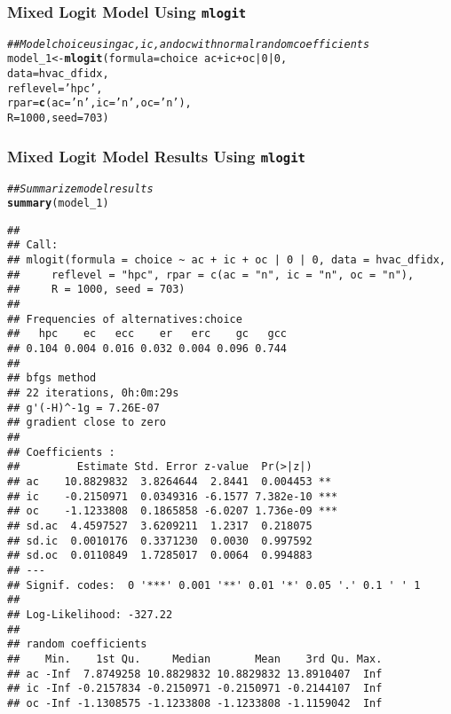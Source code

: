 \documentclass{beamer}\usepackage[]{graphicx}\usepackage[]{color}
\makeatletter
\newcommand{\hlnum}[1]{\textcolor[rgb]{0.686,0.059,0.569}{#1}}%
\newcommand{\hlstr}[1]{\textcolor[rgb]{0.192,0.494,0.8}{#1}}%
\newcommand{\hlcom}[1]{\textcolor[rgb]{0.678,0.584,0.686}{\textit{#1}}}%
\newcommand{\hlopt}[1]{\textcolor[rgb]{0,0,0}{#1}}%
\newcommand{\hlstd}[1]{\textcolor[rgb]{0.345,0.345,0.345}{#1}}%
\newcommand{\hlkwb}[1]{\textcolor[rgb]{0.69,0.353,0.396}{#1}}%
\newcommand{\hlkwc}[1]{\textcolor[rgb]{0.333,0.667,0.333}{#1}}%
\newcommand{\hlkwd}[1]{\textcolor[rgb]{0.737,0.353,0.396}{\textbf{#1}}}%
\newenvironment{kframe}{%
 \def\at@end@of@kframe{}%
 \ifinner\ifhmode%
  \def\at@end@of@kframe{\end{minipage}}%
  \begin{minipage}{\columnwidth}%
 \fi\fi%
 \def\FrameCommand##1{\hskip\@totalleftmargin \hskip-\fboxsep
 \colorbox{shadecolor}{##1}\hskip-\fboxsep
     \hskip-\linewidth \hskip-\@totalleftmargin \hskip\columnwidth}%
 \MakeFramed {\advance\hsize-\width
   \@totalleftmargin\z@ \linewidth\hsize
   \@setminipage}}%
 {\par\unskip\endMakeFramed%
 \at@end@of@kframe}
\newenvironment{knitrout}{}{} %
\makeatother
\begin{document}
\begin{frame}[fragile]\frametitle{Mixed Logit Model Using \texttt{mlogit}}
\begin{knitrout}\footnotesize
{}\color{fgcolor}\begin{kframe}
\begin{alltt}
\hlcom{## Model choice using ac, ic, and oc with normal random coefficients}
\hlstd{model_1} \hlkwb{<-} \hlkwd{mlogit}\hlstd{(}\hlkwc{formula} \hlstd{= choice} \hlopt{~} \hlstd{ac} \hlopt{+} \hlstd{ic} \hlopt{+} \hlstd{oc} \hlopt{|} \hlnum{0} \hlopt{|} \hlnum{0}\hlstd{,}
                  \hlkwc{data} \hlstd{= hvac_dfidx,}
                  \hlkwc{reflevel} \hlstd{=} \hlstr{'hpc'}\hlstd{,}
                  \hlkwc{rpar} \hlstd{=} \hlkwd{c}\hlstd{(}\hlkwc{ac} \hlstd{=} \hlstr{'n'}\hlstd{,} \hlkwc{ic} \hlstd{=} \hlstr{'n'}\hlstd{,} \hlkwc{oc} \hlstd{=} \hlstr{'n'}\hlstd{),}
                  \hlkwc{R} \hlstd{=} \hlnum{1000}\hlstd{,} \hlkwc{seed} \hlstd{=} \hlnum{703}\hlstd{)}
\end{alltt}
\end{kframe}
\end{knitrout}
\end{frame}

\begin{frame}[fragile]\frametitle{Mixed Logit Model Results Using \texttt{mlogit}}
    \vspace{1ex}
\begin{knitrout}\tiny
{}\color{fgcolor}\begin{kframe}
\begin{alltt}
\hlcom{## Summarize model results}
\hlkwd{summary}\hlstd{(model_1)}
\end{alltt}
\begin{verbatim}
## 
## Call:
## mlogit(formula = choice ~ ac + ic + oc | 0 | 0, data = hvac_dfidx, 
##     reflevel = "hpc", rpar = c(ac = "n", ic = "n", oc = "n"), 
##     R = 1000, seed = 703)
## 
## Frequencies of alternatives:choice
##   hpc    ec   ecc    er   erc    gc   gcc 
## 0.104 0.004 0.016 0.032 0.004 0.096 0.744 
## 
## bfgs method
## 22 iterations, 0h:0m:29s 
## g'(-H)^-1g = 7.26E-07 
## gradient close to zero 
## 
## Coefficients :
##         Estimate Std. Error z-value  Pr(>|z|)    
## ac    10.8829832  3.8264644  2.8441  0.004453 ** 
## ic    -0.2150971  0.0349316 -6.1577 7.382e-10 ***
## oc    -1.1233808  0.1865858 -6.0207 1.736e-09 ***
## sd.ac  4.4597527  3.6209211  1.2317  0.218075    
## sd.ic  0.0010176  0.3371230  0.0030  0.997592    
## sd.oc  0.0110849  1.7285017  0.0064  0.994883    
## ---
## Signif. codes:  0 '***' 0.001 '**' 0.01 '*' 0.05 '.' 0.1 ' ' 1
## 
## Log-Likelihood: -327.22
## 
## random coefficients
##    Min.    1st Qu.     Median       Mean    3rd Qu. Max.
## ac -Inf  7.8749258 10.8829832 10.8829832 13.8910407  Inf
## ic -Inf -0.2157834 -0.2150971 -0.2150971 -0.2144107  Inf
## oc -Inf -1.1308575 -1.1233808 -1.1233808 -1.1159042  Inf
\end{verbatim}
\end{kframe}
\end{knitrout}
\end{frame}
\end{document}
